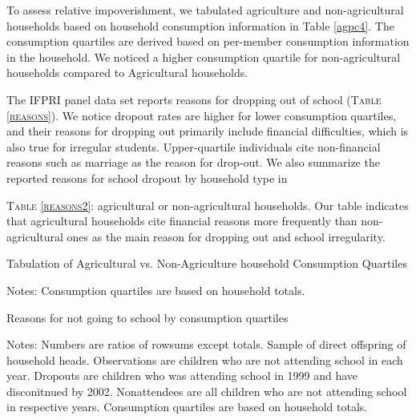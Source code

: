 \documentclass[12pt,letterpaper]{article}\usepackage[margin=1in]{geometry}
\newcommand{\0}{\ensuremath{\mbox{\boldmath $0$}}}
\begin{document}
\pagebreak


To assess relative impoverishment, we tabulated agriculture and non-agricultural households based on household consumption information in Table \ref{agpc4}. The consumption quartiles are derived based on per-member consumption information in the household. We noticed a higher consumption quartile for non-agricultural households compared to Agricultural households.

The IFPRI panel data set reports reasons for dropping out of school (\textsc{\small Table \ref{reasons}}). We notice dropout rates are higher for lower consumption quartiles, and their reasons for dropping out primarily include financial difficulties, which is also true for irregular students. Upper-quartile individuals cite non-financial reasons such as marriage as the reason for drop-out. We also summarize the reported reasons for school dropout by household type in {\textsc{\small Table \ref{reasons2}}: agricultural or non-agricultural households. Our table indicates that agricultural households cite financial reasons more frequently than non-agricultural ones as the main reason for dropping out and school irregularity. 

\begin{table}
\caption{Tabulation of Agricultural vs. Non-Agriculture household Consumption Quartiles}
\label{agpc4}
\hfil

\hfil\begin{minipage}{16cm}\footnotesize Notes: Consumption quartiles are based on household totals.\end{minipage}
\end{table}



\begin{table}
\caption{Reasons for not going to school by consumption quartiles}
\label{reasons}

\hfil

\vspace{2ex}
\hfil\begin{minipage}{16cm}\footnotesize Notes: Numbers are ratios of rowsums except totals. Sample of direct offspring of household heads. Observations are children who are not attending school in each year. Dropouts are children who was attending school in 1999 and have disconitnued by 2002. Nonattendees are all children who are not attending school in respective years. Consumption quartiles are based on household totals.\end{minipage}


\end{table}}
\end{document}
